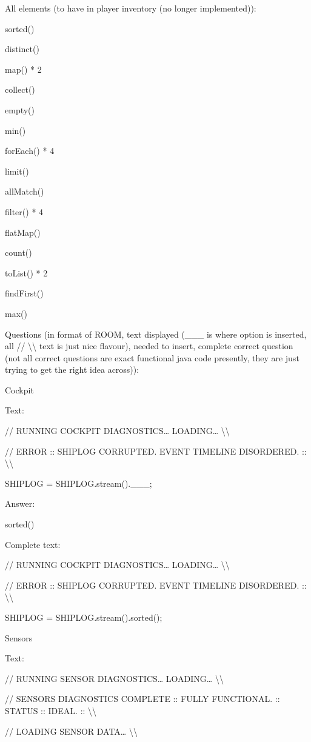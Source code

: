 \documentclass[
]{article}
\begin{document}
All elements (to have in player inventory (no longer implemented)):

sorted()

distinct()

map() * 2

collect()

empty()

min()

forEach() * 4

limit()

allMatch()

filter() * 4

flatMap()

count()

toList() * 2

findFirst()

max()

Questions (in format of ROOM, text displayed (\_\_\_ is where option is
inserted, all // \textbackslash\textbackslash{} text is just nice
flavour), needed to insert, complete correct question (not all correct
questions are exact functional java code presently, they are just trying
to get the right idea across)):

Cockpit

Text:

// RUNNING COCKPIT DIAGNOSTICS\ldots{} LOADING\ldots{}
\textbackslash\textbackslash{}

// ERROR :: SHIPLOG CORRUPTED. EVENT TIMELINE DISORDERED. ::
\textbackslash\textbackslash{}

SHIPLOG = SHIPLOG.stream().\_\_\_;

Answer:

sorted()

Complete text:

// RUNNING COCKPIT DIAGNOSTICS\ldots{} LOADING\ldots{}
\textbackslash\textbackslash{}

// ERROR :: SHIPLOG CORRUPTED. EVENT TIMELINE DISORDERED. ::
\textbackslash\textbackslash{}

SHIPLOG = SHIPLOG.stream().sorted();

Sensors

Text:

// RUNNING SENSOR DIAGNOSTICS\ldots{} LOADING\ldots{}
\textbackslash\textbackslash{}

// SENSORS DIAGNOSTICS COMPLETE :: FULLY FUNCTIONAL. :: STATUS :: IDEAL.
:: \textbackslash\textbackslash{}

// LOADING SENSOR DATA\ldots{} \textbackslash\textbackslash{}
\end{document}
